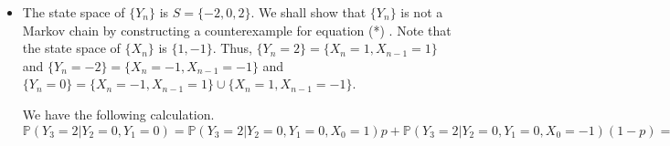 \documentclass[  11pt]{article}
\begin{document}
\begin{ExerciseList}
\begin{itemize}
 $\mathbb{P}(S_{n+1} = j | S_n = i, S_{n-1}, ..., S_0) = \mathbb{P}(S_n + X_{n+1} = j | S_n = i, S_{n-1}, ..., S_0) = \mathbb{P}(X_{n+1} = j-S_n | S_n = i, S_{n-1}, ..., S_0)$. 
 Note $S_n-S_{n-1}=X_n$, then
the conditional information of $S_n = i, S_{n-1}, ..., S_0$  is 
equal to the conditional information of $S_n = i, X_{n-1}, ..., X_1, X_0$.
 Since $\{X_n\}$ are iid,  meaning the choice of $X_{n+1}$ does not depend on $X_i$ $\forall i \in \{0,1,...,n\}$, $\mathbb{P}(X_{n+1} = j-S_n | S_n = i, S_{n-1}=s_{n-1}, ..., S_0=s_0) = \mathbb{P}(X_{n+1} = j-S_n | S_n = i,X_{n-1}=s_{n-1}-s_{n-2},\ldots, X_1=s_1-s_0, X_0=s_0)
 = \mathbb{P}(X_{n+1} = j-S_n | S_n = i)=
  \mathbb{P}(X_{n+1}=j-i) $. Hence $\{S_n\}_{n\ge 0}$ is a Markov Chain. \\ 

The value of $S_n$ ($n\in \mathbb{N}$) covers the whole $\mathbb{Z}$, so the state space for $S_n$ is $\mathbb{Z}$ (see page 7, part 1 of lecture slides) and the transition matrix is a countable infinite matrix with element 
\begin{equation}
\begin{array}{ll}
\mathbb{P}(i,j) = p & \text{ if } j = i+1 \\
\mathbb{P}(i,j) = 1 - p & \text{ if } j = i-1 \\
\mathbb{P}(i,j) = 0 & \text{ otherwise} \\
\end{array}
\end{equation}
Note that $P(i,j)$ means the probability of finding next step $S_{k+1}$ as $j$ provided that current value of $S_k$ is $i$ ($k\in \mathbb{N}$), and that $i,j\in \mathbb{Z}$.



 
\item The state space of $\{Y_n\}$ is $S=\{-2,0,2\}$.
We shall show that $\{Y_n\}$ is not  a Markov chain by constructing a counterexample  for  equation (*) .
Note that  the state space of $\{X_n\}$ is $\{1,-1\}$.
Thus, $\{Y_n=2\}=\{X_n=1, X_{n-1}=1\}$ and 
$\{Y_n=-2\}=\{X_n=-1, X_{n-1}=-1\}$ and 
$\{Y_n=0\}=\{X_n=-1, X_{n-1}=1\}\cup\{X_n=1, X_{n-1}=-1\} $. \par
We have the following calculation.
$\mathbb{P}(Y_{3} = 2 | Y_{2} = 0,  Y_{1}= 0 )
=\mathbb{P}(Y_{3} = 2 | Y_{2} = 0,  Y_{1}= 0, X_0=1 ) p + 
\mathbb{P}(Y_{3} = 2 | Y_{2} = 0,  Y_{1}= 0 , X_0=-1 ) (1-p)  
=\mathbb{P}(X_{3}=1,X_2 = 1 | X_{2} = 1,  X_{1}= -1, X_0=1 ) p + 
\mathbb{P}(X_{3} = 1, X_2=1 | X_{2} = -1,  X_{1}= 1 , X_0=-1 ) (1-p)  
=\mathbb{P}(X_{3}=1 ) p + 0 =p^2.
$


\end{itemize}
\end{ExerciseList}
\end{document}
